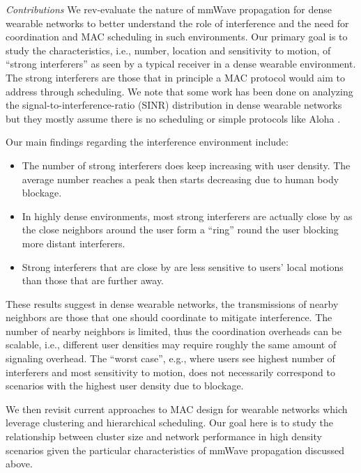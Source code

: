 \documentclass[10pt, conference, letterpaper]{IEEEtran}
\begin{document}
\emph{Contributions}
We rev-evaluate the nature of mmWave propagation for dense wearable networks to better understand the role of interference and the need for coordination and MAC scheduling in such environments. 
Our primary goal is to study the characteristics, i.e., number, location and sensitivity to motion, of ``strong interferers'' as seen by a typical receiver in a dense wearable environment. 
The strong interferers are those that in principle a MAC protocol would aim to address through scheduling. 
We note that some work has been done on analyzing the signal-to-interference-ratio (SINR) distribution in dense wearable networks but they mostly assume there is no scheduling or simple protocols like Aloha \cite{interferencefinitesized}\cite{enclosedmmwave}.

Our main findings regarding the interference environment include: 
\begin{itemize}
	\item The number of strong interferers does keep increasing with user density. 
	The average number reaches a peak then starts decreasing due to human body blockage. 
	\item In highly dense environments, most strong interferers are actually close by as the close neighbors around the user form a ``ring'' round the user blocking more distant interferers. 
	\item Strong interferers that are close by are less sensitive to users' local motions than those that are further away. 
\end{itemize}

These results suggest in dense wearable networks, the transmissions of nearby neighbors are those that one should coordinate to mitigate interference.  
The number of nearby neighbors is limited, thus the coordination overheads can be scalable, i.e., different user densities may require roughly the same amount of signaling overhead. 
The ``worst case'', e.g., where users see highest number of interferers and most sensitivity to motion, does not necessarily correspond to scenarios with the highest user density due to blockage.

We then revisit current approaches to MAC design for wearable networks which leverage clustering and hierarchical scheduling. 
Our goal here is to study the relationship between cluster size and network performance in high density scenarios given the particular characteristics of mmWave propagation discussed above. 
\end{document}
